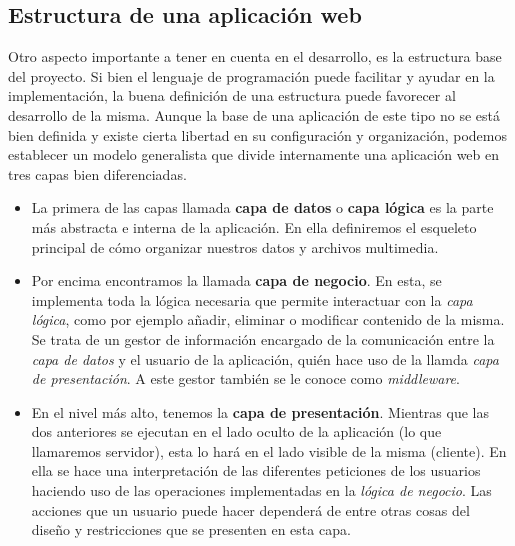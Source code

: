 \documentclass[../main.tex]{subfiles}
\begin{document}
    
    
    
    \subsection{Estructura de una aplicación web}
    
    Otro aspecto importante a tener en cuenta en el desarrollo, es la estructura base del proyecto. Si bien el lenguaje de programación puede facilitar y ayudar en la implementación, la buena definición de una estructura puede favorecer al desarrollo de la misma. Aunque la base de una aplicación de este tipo no se está bien definida y existe cierta libertad en su configuración y organización, podemos establecer un modelo generalista que divide internamente una aplicación web en tres capas bien diferenciadas.
    
    \begin{itemize}
        \item La primera de las capas llamada \textbf{capa de datos} o \textbf{capa lógica} es la parte más abstracta e interna de la aplicación. En ella definiremos el esqueleto principal de cómo organizar nuestros datos y archivos multimedia.
        
        \item Por encima encontramos la llamada \textbf{capa de negocio}. En esta, se implementa toda la lógica necesaria que permite interactuar con la \textit{capa lógica}, como por ejemplo añadir, eliminar o modificar contenido de la misma. Se trata de un gestor de información encargado de la comunicación entre la \textit{capa de datos} y el usuario de la aplicación, quién hace uso de la llamda \textit{capa de presentación}. A este gestor también se le conoce como \textit{middleware}.
                
        \item En el nivel más alto, tenemos la \textbf{capa de presentación}. Mientras que las dos anteriores se ejecutan en el lado oculto de la aplicación (lo que llamaremos servidor), esta lo hará en el lado visible de la misma (cliente). En ella se hace una interpretación de las diferentes peticiones de los usuarios haciendo uso de las operaciones implementadas en la \textit{lógica de negocio}. Las acciones que un usuario puede hacer dependerá de entre otras cosas del diseño y restricciones que se presenten en esta capa.
        
        
      
    \end{itemize}
    
\end{document}
